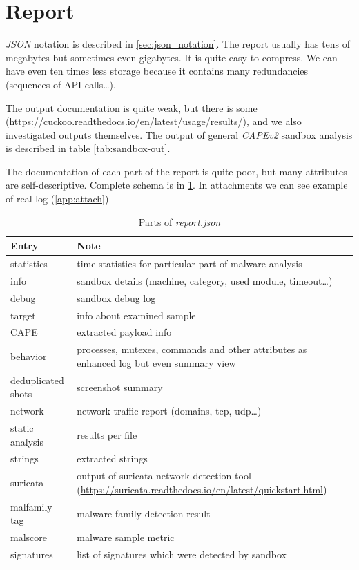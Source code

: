 \section{Report}
\emph{JSON} notation is described in \ref{sec:json_notation}. The report usually has tens of megabytes but sometimes even gigabytes. It is quite easy to compress. We can have even ten times less storage because it contains many redundancies (sequences of API calls\dots). 


The output documentation is quite weak, but there is some (\url{https://cuckoo.readthedocs.io/en/latest/usage/results/}), and we also investigated outputs themselves. The output of general \emph{CAPEv2} sandbox analysis is described in table \ref{tab:sandbox-out}.

The documentation of each part of the report is quite poor, but many attributes are self-descriptive. Complete schema is in \ref{tab:report}. In attachments we can see example of real log (\ref{app:attach})

\begin{table}[h]
  \centering
  \caption{Parts of \emph{report.json}}
  \begin{tabular}{p{4cm}p{10cm}} 
      \toprule
      \textbf{Entry} &
      \textbf{Note} \\
      \midrule
      statistics & time statistics for particular part of malware analysis \\
      \midrule
      info & sandbox details (machine, category, used module, timeout\dots) \\
      \midrule
      debug & sandbox debug log \\
      \midrule
      target &  info about examined sample\\
      \midrule
      CAPE & extracted payload info \\
      \midrule
      behavior & processes, mutexes, commands and other attributes as enhanced log but even summary view \\
      \midrule
      deduplicated shots & screenshot summary \\
      \midrule
      network & network traffic report (domains, tcp, udp\dots) \\
      \midrule
      static analysis & results per file \\
      \midrule
      strings & extracted strings \\
      \midrule
      suricata &  output of suricata network detection tool (\url{https://suricata.readthedocs.io/en/latest/quickstart.html})\\
      \midrule
      malfamily tag &  malware family detection result\\
      \midrule
      malscore &  malware sample metric\\
      \midrule
      signatures &  list of signatures which were detected by sandbox \\
      \bottomrule
  \end{tabular}
  \label{tab:report}
\end{table}


